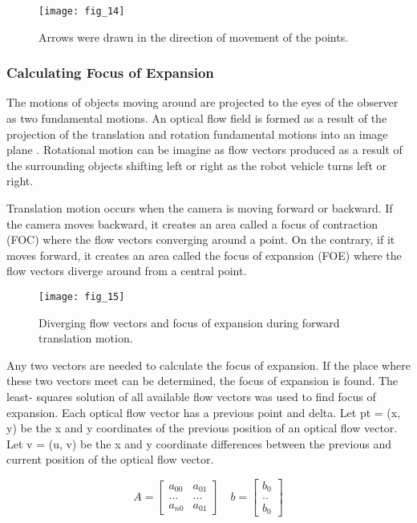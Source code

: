 \documentclass[twocolumn, switch]{article} %
\begin{document}
\begin{figure}[h]
    \centering
    \texttt{[image: fig\_14]}
    \caption{Arrows were drawn in the direction of movement of
the points.}
    \label{fig:fig14}
\end{figure}

\subsubsection{Calculating Focus of Expansion}

The motions of objects moving around are projected to the
eyes of the observer as two fundamental motions. An optical
flow field is formed as a result of the projection of the
translation and rotation fundamental motions into an image
plane \cite{o2005optical}. Rotational motion can be imagine as flow vectors
produced as a result of the surrounding objects shifting left
or right as the robot vehicle turns left or right.

Translation motion occurs when the camera is moving
forward or backward. If the camera moves backward, it
creates an area called a focus of contraction (FOC) where the
flow vectors converging around a point. On the contrary, if
it moves forward, it creates an area called the focus of
expansion (FOE) where the flow vectors diverge around
from a central point.

\begin{figure}[h]
    \centering
    \texttt{[image: fig\_15]}
    \caption{Diverging flow vectors and focus of expansion
during forward translation motion.}
    \label{fig:fig15}
\end{figure}

Any two vectors are needed to calculate the focus of
expansion. If the place where these two vectors meet can be
determined, the focus of expansion is found. The least-
squares \cite{levenberg1944method} solution of all available flow vectors was used
to find focus of expansion. Each optical flow vector has a
previous point and delta. Let pt = (x, y) be the x and y
coordinates of the previous position of an optical flow
vector. Let v = (u, v) be the x and y coordinate differences
between the previous and current position of the optical flow
vector.

\begin{equation}
	A=\begin{bmatrix}
		a_{00} & a_{01}\\
		...  & ... \\
		a_{n0} & a_{01}
	\end{bmatrix} \quad
	b=\begin{bmatrix}
		b_0\\
		..  \\
		b_0
	\end{bmatrix}
\end{equation}
\end{document}
